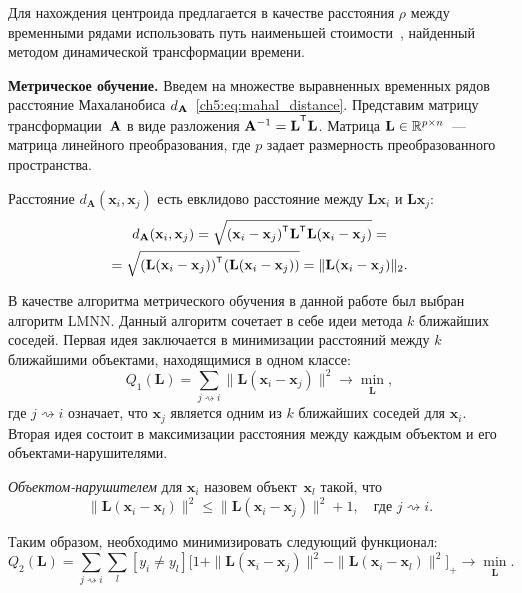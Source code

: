 \documentclass[11pt, a5paper]{dissert}
\begin{document}
Для нахождения центроида предлагается в качестве расстояния $\rho$ между временными рядами использовать путь наименьшей стоимости~\cite{berndt1994using,muller2007dynamic}, найденный методом динамической трансформации времени.

\textbf{Метрическое обучение.}
Введем на множестве выравненных временных рядов расстояние Махаланобиса $d_{\mathbf{A}}$~\ref{ch5:eq:mahal_distance}.
Представим матрицу трансформации~$\mathbf{A}$ в виде разложения $\mathbf{A}^{-1} = \mathbf{L}^{\T}  \mathbf{L}$.
Матрица $\mathbf{L} \in \mathbb{R}^{p \times n}$~--- матрица линейного преобразования, где $p$ задает размерность преобразованного пространства. 

Расстояние $d_\mathbf{A} (\mathbf{x}_i, \mathbf{x}_j)$ есть евклидово расстояние между $\mathbf{Lx}_i$ и $\mathbf{Lx}_j$:
\begin{multline*}
	d_\mathbf{A} (\mathbf{x}_i, \mathbf{x}_j) = \sqrt{(\mathbf{x}_i - \mathbf{x}_j)^{\T} \mathbf{L}^{\T} \mathbf{L} (\mathbf{x}_i - \mathbf{x}_j)} = \\= \sqrt{(\mathbf{L} (\mathbf{x}_i - \mathbf{x}_j))^{\T} (\mathbf{L} (\mathbf{x}_i - \mathbf{x}_j))} = \|\mathbf{L} (\mathbf{x}_i - \mathbf{x}_j)\|_2.
\end{multline*}

В качестве алгоритма метрического обучения в данной работе был выбран алгоритм LMNN. 
Данный алгоритм сочетает в себе идеи метода $k$ ближайших соседей. 
Первая идея заключается в минимизации расстояний между $k$ ближайшими объектами, находящимися в одном классе:
\[
	Q_1(\mathbf{L}) = \sum_{j \rightsquigarrow i} \|\mathbf{L}(\mathbf{x}_i - \mathbf{x}_j)\|^2 \rightarrow \min_{\mathbf{L}},
\]
где $j \rightsquigarrow i$ означает, что $\mathbf{x}_j$ является одним из $k$ ближайших соседей для $\mathbf{x}_i$.
Вторая идея состоит в максимизации расстояния между каждым объектом и его объектами-нарушителями. 
\begin{definition}
	\textit{Объектом-нарушителем} для $\mathbf{x}_i$ назовем объект~$\mathbf{x}_l$ такой, что
	\begin{equation}
		\label{ch5:eq:impostor}
		\|\mathbf{L}(\mathbf{x}_i - \mathbf{x}_l)\|^2 \leq \|\mathbf{L}(\mathbf{x}_i - \mathbf{x}_j)\|^2 + 1, \quad \text{где $j \rightsquigarrow i$}.
	\end{equation}
\end{definition}
Таким образом, необходимо минимизировать следующий функционал:
\[
	Q_2(\mathbf{L}) = \sum_{j \rightsquigarrow i} \sum_l [y_i \neq y_l] \bigl[1 + \|\mathbf{L}(\mathbf{x}_i - \mathbf{x}_j)\|^2 - \|\mathbf{L}(\mathbf{x}_i - \mathbf{x}_l)\|^2\bigr]_+ \rightarrow \min_{\mathbf{L}}.
\]
\end{document}

